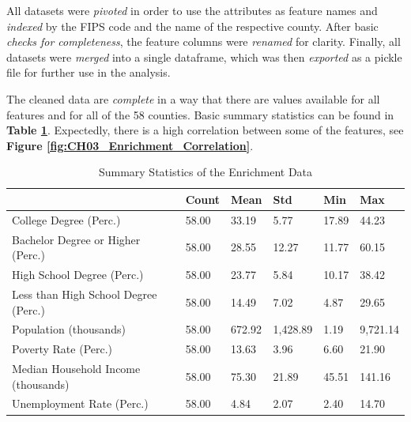 All datasets were \textit{pivoted} in order to use the attributes as feature names and \textit{indexed} by the FIPS code and the name of the respective county. After basic \textit{checks for completeness}, the feature columns were \textit{renamed} for clarity. Finally, all datasets were \textit{merged} into a single dataframe, which was then \textit{exported} as a pickle file for further use in the analysis.


The cleaned data are \textit{complete} in a way that there are values available for all features and for all of the 58 counties. Basic summary statistics can be found in \textbf{Table \ref{tab:enrichment_summary}}. Expectedly, there is a high correlation between some of the features, see \textbf{Figure \ref{fig:CH03_Enrichment_Correlation}}.

\begin{table}[h]
    \centering
    \begin{tabularx}{\textwidth}{llllll}
    \hline
     & \textbf{Count} & \textbf{Mean} & \textbf{Std} & \textbf{Min} & \textbf{Max} \\
    \hline
    College Degree (Perc.) & 58.00 & 33.19 & 5.77 & 17.89 & 44.23 \\
    \hline
    Bachelor Degree or Higher (Perc.) & 58.00 & 28.55 & 12.27 & 11.77 & 60.15 \\
    \hline
    High School Degree (Perc.) & 58.00 & 23.77 & 5.84 & 10.17 & 38.42 \\
    \hline
    Less than High School Degree (Perc.) & 58.00 & 14.49 & 7.02 & 4.87 & 29.65 \\
    \hline
    Population (thousands) & 58.00 & 672.92 & 1,428.89 & 1.19 & 9,721.14 \\
    \hline
    Poverty Rate (Perc.) & 58.00 & 13.63 & 3.96 & 6.60 & 21.90 \\
    \hline
    Median Household Income (thousands) & 58.00 & 75.30 & 21.89 & 45.51 & 141.16 \\
    \hline
    Unemployment Rate (Perc.) & 58.00 & 4.84 & 2.07 & 2.40 & 14.70 \\
    \hline
    \end{tabularx}
    \caption{Summary Statistics of the Enrichment Data}
    \label{tab:enrichment_summary}
\end{table}

